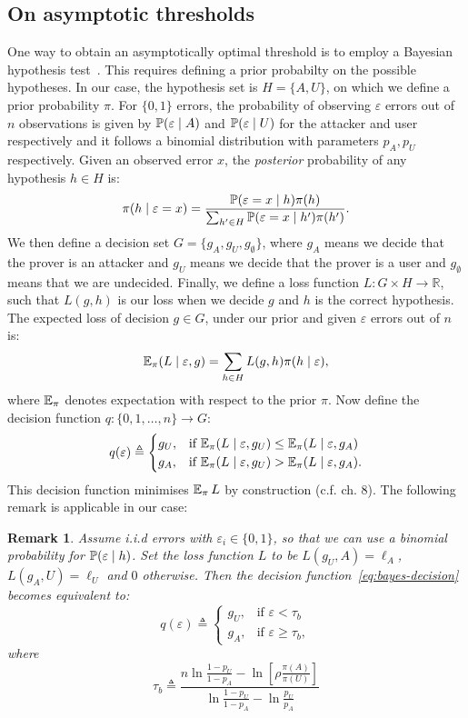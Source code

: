 \documentclass[a4paper]{article}
\newcommand \defn {\mathrel{\triangleq}}
\renewcommand\Pr{\mathop{\mbox{\ensuremath{\mathbb{P}}}}\nolimits}
\newcommand\E{\mathop{\mbox{\ensuremath{\mathbb{E}}}}\nolimits}
\newcommand \thr {\tau}
\newcommand \err {\varepsilon}
\newcommand \pa {p_A}
\newcommand \pu {p_U}
\newcommand \LA {\ell_A}
\newcommand \LU {\ell_U}
\newcommand \decfun {q}
\newcommand \decs {g}
\newcommand \Decs {G}
\newcommand\Reals {{\mathds{R}}}
\theoremstyle{plain} \newtheorem{remark}{Remark}
\theoremstyle{plain} \newtheorem{definition}{Definition}
\theoremstyle{plain} \newtheorem{example}{Example}
\theoremstyle{plain} \newtheorem{assumption}{Assumption}
\theoremstyle{plain} \newtheorem{conjecture}{Conjecture}
\theoremstyle{plain} \newtheorem{theorem}{Theorem}
\theoremstyle{plain} \newtheorem{proposition}{Proposition}
\theoremstyle{plain} \newtheorem{lemma}{Lemma}
\theoremstyle{plain} \newtheorem{corollary}{Corollary}
\begin{document}
\subsection{On asymptotic thresholds}
\label{app:asymptotics}
One way to obtain an asymptotically optimal threshold is to employ a
Bayesian hypothesis test~\cite{Degroot:OptimalStatisticalDecisions}.
This requires defining a prior probabilty on the possible
hypotheses. In our case, the hypothesis set is $H = \{A, U\}$, on
which we define a prior probability $\pi$. For $\{0,1\}$ errors, the
probability of observing $\err$ errors out of $n$ observations is
given by $\Pr(\err \mid A)$ and $\Pr(\err \mid U)$ for the attacker
and user respectively and it follows a binomial distribution with
parameters $\pa, \pu$ respectively. Given an observed error $x$, the
{\em posterior} probability of any hypothesis $h \in H$ is:
\[
\pi(h \mid \err = x) = \frac{\Pr(\err = x \mid h) \pi(h)}{\sum_{h' \in
    H}\Pr(\err = x \mid h') \pi(h')}.
\]
We then define a decision set $\Decs = \{\decs_A, \decs_U,
\decs_\emptyset\}$, where $\decs_A$ means we decide that the prover is
an attacker and $\decs_U$ means we decide that the prover is a user
and $\decs_\emptyset$ means that we are undecided.  Finally, we define
a loss function $L : \Decs \times H \to \Reals$, such that $L(\decs,
h)$ is our loss when we decide $\decs$ and $h$ is the correct
hypothesis.  The expected loss of decision $\decs \in \Decs$, under
our prior and given $\err$ errors out of $n$ is:
\[
\E_\pi(L \mid \err, \decs) = \sum_{h \in H} L(\decs, h) \pi(h \mid \err),
\]
where $\E_\pi$ denotes expectation with respect to the prior $\pi$.
Now define the decision function $\decfun : \{0, 1, \ldots, n\} \to
\Decs$:
\begin{equation}
\decfun(\err) \defn
\begin{cases}
  \decs_U, &\textrm{if $\E_\pi(L \mid \err, \decs_U) \leq \E_\pi(L \mid \err, \decs_A)$}
    \\
  \decs_A, &\textrm{if $\E_\pi(L \mid \err, \decs_U) > \E_\pi(L \mid \err, \decs_A)$}.
\end{cases}
\label{eq:bayes-decision}
\end{equation}
This decision function minimises $\E_\pi L$ by construction
(c.f. \cite{Degroot:OptimalStatisticalDecisions} ch. 8). 
The following
remark is applicable in our case:
\begin{remark} Assume i.i.d errors with $\err_i \in \{0, 1\}$, so that
  we can use a binomial probability for $\Pr(\err \mid h)$.  Set the
  loss function $L$ to be $L(\decs_U, A) = \LA$, $L(\decs_A, U) = \LU$
  and $0$ otherwise.  Then the decision
  function~\eqref{eq:bayes-decision} becomes equivalent to:
\[
\decfun(\err) \defn
\begin{cases}
  \decs_U, &\textrm{if $\err < \thr_b$}\\
  \decs_A, &\textrm{if $\err \geq \thr_b$},
\end{cases}
\]
where
\[
\thr_b 
\defn 
\frac {n \ln \frac {1-\pu} {1-\pa} - \ln [\rho \frac{\pi(A)}{\pi(U)}]}
{\ln \frac {1-\pu} {1-\pa} - {\ln{ \frac {\pu}{\pa}}}}
\]
\end{remark}
\end{document}
